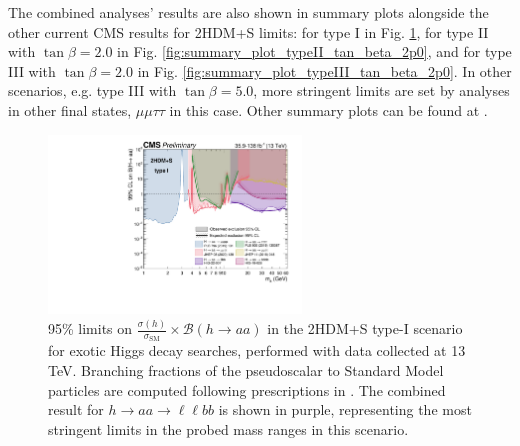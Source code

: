 The combined analyses' results are also shown in summary plots alongside the other current CMS results for 2HDM+S limits: for type I in Fig. \ref{fig:summary_plot_type_I}, for type II with $\tan\beta = 2.0$ in Fig. \ref{fig:summary_plot_typeII_tan_beta_2p0}, and for type III with $\tan\beta = 2.0$ in Fig. \ref{fig:summary_plot_typeIII_tan_beta_2p0}. In other scenarios, e.g. type III with $\tan\beta = 5.0$, more stringent limits are set by analyses in other final states, $\mu\mu\tau\tau$ in this case. Other summary plots can be found at \cite{twiki_2HDM+S_summary-plots}.

\begin{figure}[ht]
    \begin{center}
      \includegraphics[width=0.6\textwidth]{figures/ch-13-results/summary_plot_full_run2_plot_BRaa_Type1.pdf}
    \end{center}
    \caption[95\% limits on $\frac{\sigma(h)}{\sigma_{\text{SM}}} \times \mathcal{B}(h \rightarrow aa)$ in the 2HDM+S type-I scenario for exotic Higgs decay searches, performed with data collected at 13 TeV.]{95\% limits on $\frac{\sigma(h)}{\sigma_{\text{SM}}} \times \mathcal{B}(h \rightarrow aa)$ in the 2HDM+S type-I scenario for exotic Higgs decay searches, performed with data collected at 13 TeV. Branching fractions of the pseudoscalar to Standard Model particles are computed following prescriptions in \cite{curtin_exotic_2014}. The combined result for $h\rightarrow aa \rightarrow \ell\ell bb$ \cite{CMS-HIG-22-007} is shown in purple, representing the most stringent limits in the probed mass ranges in this scenario.}
      \label{fig:summary_plot_type_I}
  \end{figure}
